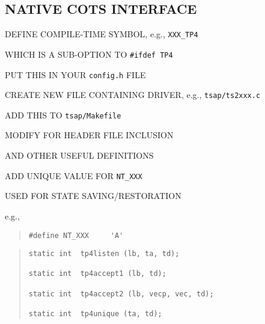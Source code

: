\begin{bwslide}
\part*	{NATIVE COTS INTERFACE}\bf

\begin{nrtc}
\item	DEFINE COMPILE-TIME SYMBOL, e.g., \verb"XXX_TP4"
    \begin{nrtc}
    \item	WHICH IS A SUB-OPTION TO \verb"#ifdef TP4"
    \end{nrtc}
    PUT THIS IN YOUR \verb"config.h" FILE

\item	CREATE NEW FILE CONTAINING DRIVER, e.g., \verb"tsap/ts2xxx.c"
    \begin{nrtc}
    \item	ADD THIS TO \verb"tsap/Makefile"    
    \end{nrtc}
\end{nrtc}
\end{bwslide}


\begin{bwslide}

\begin{nrtc}
\item	MODIFY FOR HEADER FILE INCLUSION

\item	AND OTHER USEFUL DEFINITIONS
\end{nrtc}
\end{bwslide}


\begin{bwslide}

\begin{nrtc}
\item	ADD UNIQUE VALUE FOR \verb"NT_XXX"
    \begin{nrtc}
    \item	USED FOR STATE SAVING/RESTORATION
    \end{nrtc}
    e.g.,
\begin{quote}\small\begin{verbatim}
#define NT_XXX     'A'
\end{verbatim}\end{quote}
\end{nrtc}
\end{bwslide}


\begin{bwslide}

\begin{quote}\small\begin{verbatim}
static int  tp4listen (lb, ta, td);

static int  tp4accept1 (lb, td);

static int  tp4accept2 (lb, vecp, vec, td);

static int  tp4unique (ta, td);
\end{verbatim}\end{quote}
\end{bwslide}


